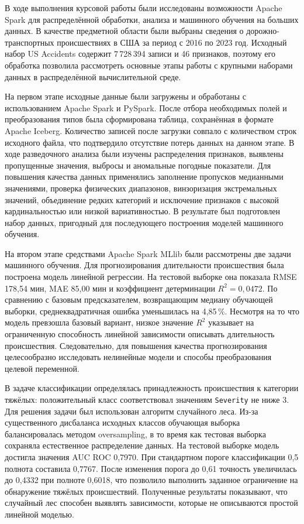 
В ходе выполнения курсовой работы были исследованы возможности Apache Spark для распределённой обработки, анализа и машинного обучения на больших данных. В качестве предметной области были выбраны сведения о дорожно-транспортных происшествиях в США за период с 2016 по 2023 год. Исходный набор US Accidents содержит 7\,728\,394 записи и 46 признаков, поэтому его обработка позволила рассмотреть основные этапы работы с крупными наборами данных в распределённой вычислительной среде.

На первом этапе исходные данные были загружены и обработаны с использованием Apache Spark и PySpark. После отбора необходимых полей и преобразования типов была сформирована таблица, сохранённая в формате Apache Iceberg. Количество записей после загрузки совпало с количеством строк исходного файла, что подтвердило отсутствие потерь данных на данном этапе. В ходе разведочного анализа были изучены распределения признаков, выявлены пропущенные значения, выбросы и аномальные погодные показатели. Для повышения качества данных применялись заполнение пропусков медианными значениями, проверка физических диапазонов, винзоризация экстремальных значений, объединение редких категорий и исключение признаков с высокой кардинальностью или низкой вариативностью. В результате был подготовлен набор данных, пригодный для последующего построения моделей машинного обучения.

На втором этапе средствами Apache Spark MLlib были рассмотрены две задачи машинного обучения. Для прогнозирования длительности происшествия была построена модель линейной регрессии. На тестовой выборке она показала RMSE 178,54 мин, MAE 85,00 мин и коэффициент детерминации $R^2 = 0,0472$. По сравнению с базовым предсказателем, возвращающим медиану обучающей выборки, среднеквадратичная ошибка уменьшилась на 4,85\,\%. Несмотря на то что модель превзошла базовый вариант, низкое значение $R^2$ указывает на ограниченную способность линейной зависимости описывать длительность происшествия. Следовательно, для повышения качества прогнозирования целесообразно исследовать нелинейные модели и способы преобразования целевой переменной.

В задаче классификации определялась принадлежность происшествия к категории тяжёлых: положительный класс соответствовал значениям \texttt{Severity} не ниже 3. Для решения задачи был использован алгоритм случайного леса. Из-за существенного дисбаланса исходных классов обучающая выборка балансировалась методом oversampling, в то время как тестовая выборка сохраняла естественное распределение данных. На тестовой выборке модель достигла значения AUC ROC 0,7970. При стандартном пороге классификации 0,5 полнота составила 0,7767. После изменения порога до 0,61 точность увеличилась до 0,4332 при полноте 0,6018, что позволило выполнить заданное ограничение на обнаружение тяжёлых происшествий. Полученные результаты показывают, что случайный лес способен выявлять зависимости, которые не описываются простой линейной моделью.


